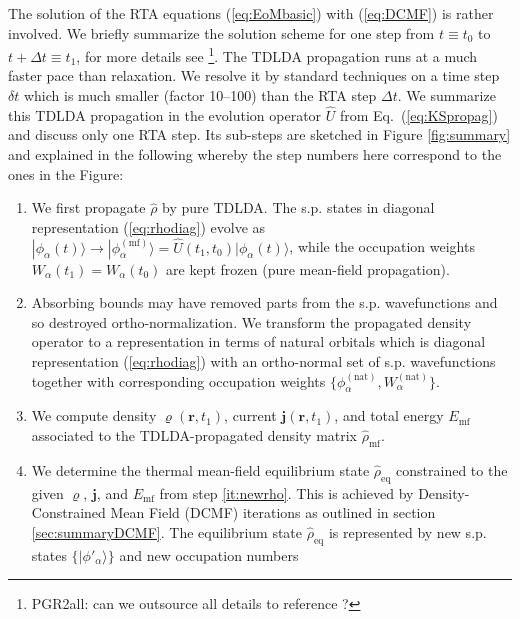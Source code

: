 \documentclass[final,1p]{elsarticle}
\newcommand{\PGRfoot}[1]{{\color{blue}\footnote{\color{blue} #1}}}
\begin{document}
The solution of the RTA equations (\ref{eq:EoMbasic}) with
(\ref{eq:DCMF}) is rather involved. We briefly summarize the solution
scheme for one step from $t\equiv t_0$ to $t\!+\!\Delta t\equiv t_1$,
for more details see \cite{Rei15a}\PGRfoot{PGR2all: can we outsource
  all details to reference \cite{Rei15a}?}.
The TDLDA propagation runs at a much faster pace than relaxation.  We
resolve it by standard techniques \cite{Cal00,Rei04aB} on a time step
$\delta t$ which is much smaller (factor 10--100) than the RTA step
$\Delta t$. We summarize this TDLDA propagation in the evolution
operator $\hat{U}$ from Eq.~(\ref{eq:KSpropag}) and discuss only one
RTA step. Its sub-steps are sketched in Figure \ref{fig:summary} and
explained in the following whereby the step numbers here correspond to
the ones in the Figure:
\begin{enumerate}
   \item\label{it:TDLDA} We first propagate $\hat{\rho}$ by pure
     TDLDA.  The s.p. states in diagonal representation
     (\ref{eq:rhodiag}) evolve as $|\phi_\alpha(t)\rangle\rightarrow
     |\phi_\alpha^\mathrm{(mf)}\rangle=\hat{U}(t_1,t_0)|\phi_\alpha(t)\rangle$,
     while the occupation weights $W_\alpha(t_1)=W_\alpha(t_0)$ are
     kept frozen (pure mean-field propagation).
   \item\label{it:natorb} Absorbing bounds may have removed parts
     from the s.p. wavefunctions and so destroyed ortho-normalization.
     We transform the propagated density operator to a representation
     in terms of natural orbitals which is  diagonal representation
     (\ref{eq:rhodiag}) with an ortho-normal set of s.p. wavefunctions
     together with corresponding occupation weights
     $\{\phi_\alpha^\mathrm{(nat)},W_\alpha^\mathrm{(nat)}\}$.
   \item\label{it:newrho} We compute density
     $\varrho(\mathbf{r},t_1)$, current
     $\mathbf{j}(\mathbf{r},t_1)$, and total energy
     $E_\mathrm{mf}$ associated to the TDLDA-propagated density matrix
     $\hat{\rho}_\mathrm{mf}$.
   \item\label{it:DCMF} We determine the thermal mean-field
     equilibrium state $\hat{\rho}_\mathrm{eq}$ constrained to the
     given $\varrho$, $\mathbf{j}$, and $E_\mathrm{mf}$ from step
     \ref{it:newrho}.  This is achieved by Density-Constrained Mean
     Field (DCMF) iterations as outlined in section
     \ref{sec:summaryDCMF}.  The equilibrium state
     $\hat{\rho}_\mathrm{eq}$ is represented by new s.p. states
     $\{|\phi'_{\alpha}\rangle\}$ and new occupation numbers

\end{enumerate}
\end{document}
